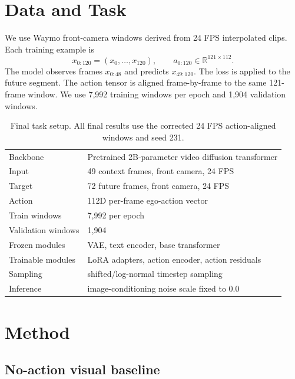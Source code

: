 \documentclass[10pt,twocolumn,letterpaper]{article}
\begin{document}
\section{Data and Task}

We use Waymo front-camera windows derived from 24 FPS interpolated clips. Each training example is
\begin{equation}
x_{0:120} = (x_0,\ldots,x_{120}),\qquad a_{0:120}\in\mathbb{R}^{121\times112}.
\end{equation}
The model observes frames $x_{0:48}$ and predicts $x_{49:120}$. The loss is applied to the future segment. The action tensor is aligned frame-by-frame to the same 121-frame window. We use 7,992 training windows per epoch and 1,904 validation windows.

\begin{table}[t]
\centering
\caption{Final task setup. All final results use the corrected 24 FPS action-aligned windows and seed 231.}
\small
\begin{tabularx}{\linewidth}{lX}
\toprule
Backbone & Pretrained 2B-parameter video diffusion transformer \\
Input & 49 context frames, front camera, 24 FPS \\
Target & 72 future frames, front camera, 24 FPS \\
Action & 112D per-frame ego-action vector \\
Train windows & 7,992 per epoch \\
Validation windows & 1,904 \\
Frozen modules & VAE, text encoder, base transformer \\
Trainable modules & LoRA adapters, action encoder, action residuals \\
Sampling & shifted/log-normal timestep sampling \\
Inference & image-conditioning noise scale fixed to 0.0 \\
\bottomrule
\end{tabularx}
\label{tab:data}
\end{table}

\section{Method}

\subsection{No-action visual baseline}
\end{document}
